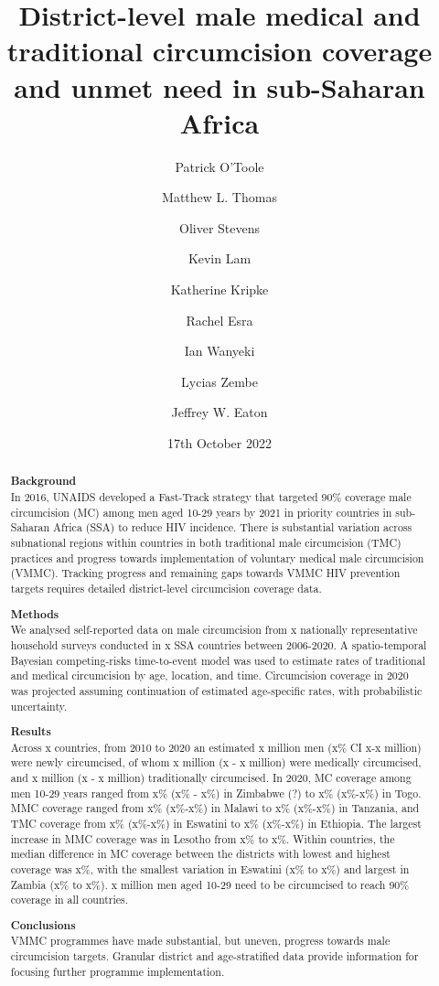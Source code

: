 \documentclass[a4paper, 12pt]{article}
\author[1]{Patrick O'Toole}
\author[1,2]{Matthew L. Thomas}
\author[1]{Oliver Stevens}
\author[1,3]{Kevin Lam}
\author[4]{Katherine Kripke}
\author[1]{Rachel Esra}
\author[5]{Ian Wanyeki}
\author[5]{Lycias Zembe}
\author[1]{Jeffrey W. Eaton}
\affil[1]{\emph{Imperial College London, London, United Kingdom}} \\
\affil[2]{\emph{Joint Centre for Excellence in Environmental Intelligence, University of Exeter and Met Office}} \\
\affil[3]{\emph{Department of Statistics, University of British Columbia}} \\
\affil[4]{\emph{Avenir Health, Takoma Park, MD, USA}} \\
\affil[5]{\emph{Joint United Nations Programme on HIV/AIDS (UNAIDS)}} \\
\date{17th October 2022}
\title{District-level male medical and traditional circumcision coverage and unmet need in sub-Saharan Africa}
\begin{document}
\maketitle

\clearpage

\begin{abstract}
  \noindent \textbf{Background} \\
  \noindent In 2016, UNAIDS developed a Fast-Track strategy that targeted 90\% coverage
  male circumcision (MC) among men aged 10-29 years by 2021 in priority countries in sub-Saharan 
  Africa (SSA) to reduce HIV incidence. There is substantial variation across subnational 
  regions within countries in both traditional male circumcision (TMC) practices and progress
  towards implementation of voluntary medical male circumcision (VMMC). Tracking progress and
  remaining gaps towards VMMC HIV prevention targets requires detailed district-level circumcision
  coverage data.

  \noindent \textbf{Methods} \\
  \noindent We analysed self-reported data on male circumcision from x nationally representative household
  surveys conducted in x SSA countries between 2006-2020. A spatio-temporal Bayesian
  competing-risks time-to-event model was used to estimate rates of traditional and medical
  circumcision by age, location, and time. Circumcision coverage in 2020 was projected assuming
  continuation of estimated age-specific rates, with probabilistic uncertainty.

  \noindent \textbf{Results} \\
  \noindent Across x countries, from 2010 to 2020 an estimated x million men (x\% CI x-x million)
  were newly circumcised, of whom x million (x - x million) were medically circumcised, and
  x million (x - x million) traditionally circumcised. In 2020, MC coverage among men 10-29
  years ranged from x\% (x\% - x\%) in Zimbabwe (?) to x\% (x\%-x\%) in Togo. MMC coverage
  ranged from x\% (x\%-x\%) in Malawi to x\% (x\%-x\%) in Tanzania, and TMC coverage
  from x\% (x\%-x\%) in Eswatini to x\% (x\%-x\%) in Ethiopia. The largest increase in MMC
  coverage was in Lesotho from x\% to x\%. Within countries, the median difference in MC
  coverage between the districts with lowest and highest coverage was x\%, with the smallest
  variation in Eswatini (x\% to x\%) and largest in Zambia (x\% to x\%). x million men aged
  10-29 need to be circumcised to reach 90\% coverage in all countries.

  \noindent \textbf{Conclusions} \\
  \noindent VMMC programmes have made substantial, but uneven, progress towards male circumcision targets. Granular district and age-stratified data provide information for focusing further programme implementation.

\end{abstract}
\end{document}
